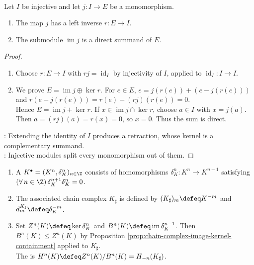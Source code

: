 \begin{proposition} \label{prop:injective-submodules-split} \\
Let $I$ be injective and let $j:I\to E$ be a monomorphism.
\begin{enumerate}[label=(\roman*)]
\setlength{\itemsep}{0pt}
\item The map $j$ has a left inverse $r:E\to I$.
\item The submodule $\operatorname{im}j$ is a direct summand of $E$.
\end{enumerate}
\begin{proof}
\begin{enumerate}[label=(\roman*)]
\setlength{\itemsep}{0pt}
\item Choose $r:E\to I$ with $rj=\operatorname{id}_I$ by injectivity of $I$, applied to $\operatorname{id}_I:I\to I$.
\item We prove $E=\operatorname{im}j\oplus\ker r$. For $e\in E$, $e=j(r(e))+(e-j(r(e)))$ and $r(e-j(r(e)))=r(e)-(rj)(r(e))=0$.\\
Hence $E=\operatorname{im}j+\ker r$. If $x\in\operatorname{im}j\cap\ker r$, choose $a\in I$ with $x=j(a)$.\\
Then $a=(rj)(a)=r(x)=0$, so $x=0$. Thus the sum is direct.
\end{enumerate}
: Extending the identity of $I$ produces a retraction, whose kernel is a complementary summand.\\
: Injective modules split every monomorphism out of them.
\end{proof}
\end{proposition}

\begin{definition} \label{def:cochain-complex-cohomology} 
\begin{enumerate}[label=(\roman*)]
\setlength{\itemsep}{0pt}
\item A  $K^\bullet=(K^n,\delta_K^n)_{n\in\Z}$ consists of homomorphisms $\delta_K^n:K^n\to K^{n+1}$ satisfying $(\forall\,n\in\Z)\,\delta_K^{n+1}\delta_K^n=0$.
\item The associated chain complex $K_\sharp$ is defined by $(K_\sharp)_m\defeq K^{-m}$ and $d_m^{K_\sharp}\defeq\delta_K^{-m}$.
\item Set $Z^n(K)\defeq\ker\delta_K^n$ and $B^n(K)\defeq\operatorname{im}\delta_K^{n-1}$. Then $B^n(K)\leq Z^n(K)$ by Proposition \ref{prop:chain-complex-image-kernel-containment} applied to $K_\sharp$.\\
The  is $H^n(K)\defeq Z^n(K)/B^n(K)=H_{-n}(K_\sharp)$.
\end{enumerate}
\end{definition}

